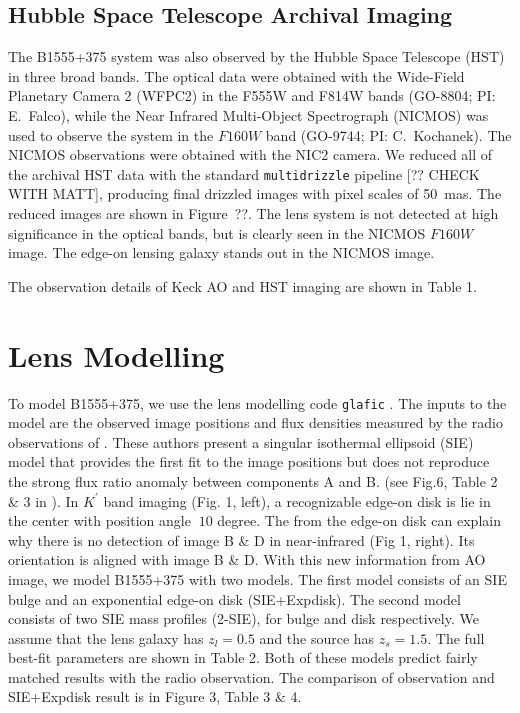 \documentclass[useAMS,usenatbib]{mn2e}
\begin{document}
\subsection{Hubble Space Telescope Archival Imaging}

The B1555+375 system was also observed by the Hubble Space Telescope
(HST) in three broad bands.  The optical data were obtained with the
Wide-Field Planetary Camera 2 (WFPC2) in the F555W and F814W bands
(GO-8804; PI: E.\ Falco), while the Near Infrared Multi-Object
Spectrograph (NICMOS) was used to observe the system in the $F160W$
band (GO-9744; PI: C.\ Kochanek).  The NICMOS observations were
obtained with the NIC2 camera.  We reduced all of the archival HST
data with the standard {\tt multidrizzle} pipeline [?? CHECK WITH
MATT], producing final drizzled images with pixel scales of
50~mas.  The reduced images are shown in Figure~??.  The lens system
is not detected at high significance in the optical bands, but is
clearly seen in the NICMOS $F160W$ image.  The edge-on lensing galaxy 
stands out in the NICMOS image.

The observation details of Keck AO and HST imaging are shown in Table 1.


\section{Lens Modelling}

To model B1555+375, we use the lens modelling code {\tt glafic}
\citep{Oguri}.  The inputs to the model are the observed image positions
and flux densities measured by the radio observations of \citet{Marlow}.
These authors present a singular isothermal ellipsoid (SIE) model that
provides the first fit to the image positions but
does not reproduce the strong flux ratio anomaly between components A and B.
(see Fig.6, Table 2 \& 3 in \citet{Marlow}). In $K^\prime$ band
imaging (Fig. 1, left), a recognizable edge-on disk is lie in the center
with position angle $~10$ degree. The from the edge-on disk can explain why there is no detection of image B \& D in near-infrared (Fig 1, right). Its orientation is aligned with image B \& D. With this new information from AO image, we model
B1555+375 with two models. The first model consists of an SIE bulge
and an exponential edge-on disk (SIE+Expdisk). The second model
consists of two SIE mass profiles (2-SIE), for bulge and disk
respectively. We assume that the lens galaxy has $z_{l}=0.5$ and the source has $z_s=1.5$. The full best-fit parameters are shown in Table 2. Both
of these models predict fairly matched results with the radio
observation. The comparison of observation and SIE+Expdisk result is
in Figure 3, Table 3 \& 4.
\end{document}
